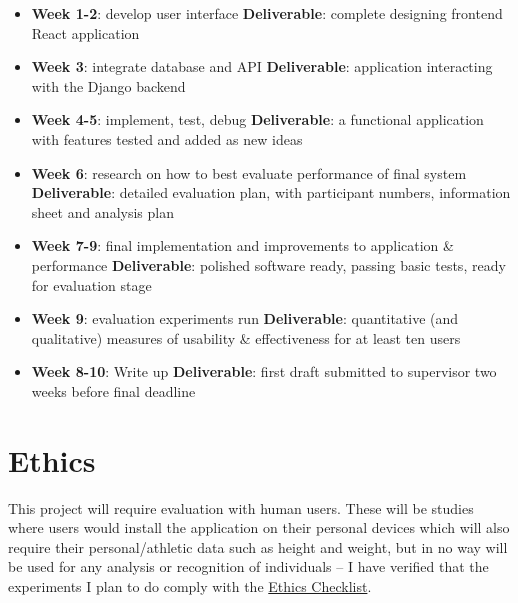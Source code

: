 \documentclass[11pt]{article}
\begin{document}
\begin{itemize}
    \tightlist
    \item
      \textbf{Week 1-2}: develop user interface\newline
      \textbf{Deliverable}: complete designing frontend React application
    \item
      \textbf{Week 3}: integrate database and API\newline
      \textbf{Deliverable}: application interacting with the Django backend
    \item
      \textbf{Week 4-5}: implement, test, debug\newline
      \textbf{Deliverable}: a functional application with features tested and added as new ideas
    \item
      \textbf{Week 6}: research on how to best evaluate performance of final system\newline
      \textbf{Deliverable}: detailed evaluation plan, with participant numbers, information sheet and analysis plan
    \item
      \textbf{Week 7-9}: final implementation and improvements to application \& performance\newline
      \textbf{Deliverable}: polished software ready, passing basic tests, ready for evaluation stage
    \item
      \textbf{Week 9}: evaluation experiments run\newline
      \textbf{Deliverable}: quantitative (and qualitative) measures of usability \& effectiveness for at least ten users
    \item
      \textbf{Week 8-10}: Write up\newline
      \textbf{Deliverable}: first draft submitted to supervisor two weeks before final deadline
\end{itemize}

\section{Ethics}

This project will require evaluation with human users. These will be studies where users would install the application on their personal devices which will also require their personal/athletic data such as height and weight, but in no way will be used for any analysis or recognition of individuals -- I have verified that the experiments I plan to do comply with the \href{https://www.dcs.gla.ac.uk/ethics}{Ethics Checklist}.
\end{document}
